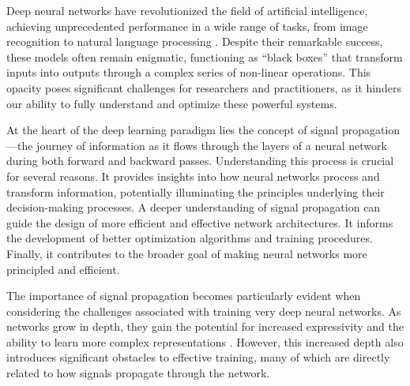 Deep neural networks have revolutionized the field of artificial intelligence, achieving unprecedented performance in a wide range of tasks, from image recognition to natural language processing \cite{zhang2019root}. Despite their remarkable success, these models often remain enigmatic, functioning as ``black boxes'' that transform inputs into outputs through a complex series of non-linear operations. This opacity poses significant challenges for researchers and practitioners, as it hinders our ability to fully understand and optimize these powerful systems.

At the heart of the deep learning paradigm lies the concept of signal propagation—the journey of information as it flows through the layers of a neural network during both forward and backward passes. Understanding this process is crucial for several reasons. It provides insights into how neural networks process and transform information, potentially illuminating the principles underlying their decision-making processes. A deeper understanding of signal propagation can guide the design of more efficient and effective network architectures. It informs the development of better optimization algorithms and training procedures. Finally, it contributes to the broader goal of making neural networks more principled and efficient.

The importance of signal propagation becomes particularly evident when considering the challenges associated with training very deep neural networks. As networks grow in depth, they gain the potential for increased expressivity and the ability to learn more complex representations \cite{bengio2009learning}. However, this increased depth also introduces significant obstacles to effective training, many of which are directly related to how signals propagate through the network.